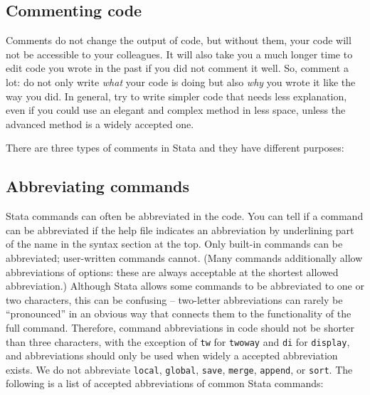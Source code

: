 \subsection{Commenting code}

Comments do not change the output of code, but without them,
your code will not be accessible to your colleagues.
It will also take you a much longer time to edit code you wrote in the past if you did not comment it well.
So, comment a lot: do not only write \textit{what} your code is doing
but also \textit{why} you wrote it like the way you did.
In general, try to write simpler code that needs less explanation,
even if you could use an elegant and complex method in less space,
unless the advanced method is a widely accepted one.

There are three types of comments in Stata and they have different purposes:


\subsection{Abbreviating commands}

Stata commands can often be abbreviated in the code.
You can tell if a command can be abbreviated if the help file indicates an abbreviation by underlining part of the name in the syntax section at the top.
Only built-in commands can be abbreviated; user-written commands cannot.
(Many commands additionally allow abbreviations of options:
these are always acceptable at the shortest allowed abbreviation.)
Although Stata allows some commands to be abbreviated to one or two characters,
this can be confusing -- two-letter abbreviations can rarely be ``pronounced''
in an obvious way that connects them to the functionality of the full command.
Therefore, command abbreviations in code should not be shorter than three characters,
with the exception of \texttt{tw} for \texttt{twoway} and \texttt{di} for \texttt{display},
and abbreviations should only be used when widely a accepted abbreviation exists.
We do not abbreviate \texttt{local}, \texttt{global}, \texttt{save}, \texttt{merge}, \texttt{append}, or \texttt{sort}.
The following is a list of accepted abbreviations of common Stata commands:

